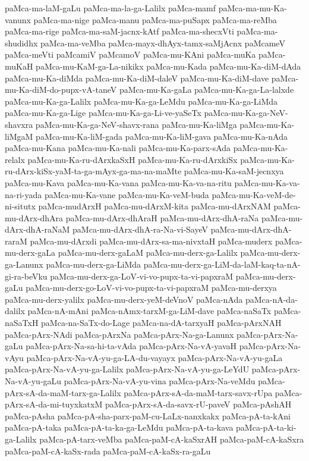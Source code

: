 {paMca-ma-laM-gaLu
paMca-ma-la-ga-Lalilx
paMca-mamf
paMca-ma-mu-Ka-vanunx
paMca-ma-nige
paMca-manu
paMca-ma-puSapx
paMca-ma-reMba
paMca-ma-rige
paMca-ma-saM-jacnx-kAtf
paMca-ma-shecxVti
paMca-ma-shudidhx
paMca-ma-veMba
paMca-mayx-dhAyx-tamx-saMjAcnx
paMcameV
paMca-meVti
paMcamiV
paMcamoV
paMca-mu-KAni
paMca-muKa
paMca-muKaH
paMca-mu-KaM-ga-La-nikikx
paMca-mu-Kada
paMca-mu-Ka-diM-dAda
paMca-mu-Ka-diMda
paMca-mu-Ka-diM-daleV
paMca-mu-Ka-diM-dave
paMca-mu-Ka-diM-do-pupx-vA-taneV
paMca-mu-Ka-gaLa
paMca-mu-Ka-ga-La-lalxde
paMca-mu-Ka-ga-Lalilx
paMca-mu-Ka-ga-LeMdu
paMca-mu-Ka-ga-LiMda
paMca-mu-Ka-ga-Lige
paMca-mu-Ka-ga-Li-ve-yaSeTx
paMca-mu-Ka-ga-NeV-shavxra
paMca-mu-Ka-ga-NeV-shavx-rana
paMca-mu-Ka-liMga
paMca-mu-Ka-liMgaM
paMca-mu-Ka-liM-gada
paMca-mu-Ka-liM-gava
paMca-mu-Ka-nAda
paMca-mu-Kana
paMca-mu-Ka-nali
paMca-mu-Ka-parx-sAda
paMca-mu-Ka-relalx
paMca-mu-Ka-ru-dArxkaSxH
paMca-mu-Ka-ru-dArxkiSx
paMca-mu-Ka-ru-dArx-kiSx-yaM-ta-ga-mAyx-ga-ma-na-maMte
paMca-mu-Ka-saM-jecnxya
paMca-mu-Kava
paMca-mu-Ka-vana
paMca-mu-Ka-va-na-ritu
paMca-mu-Ka-va-na-ri-yada
paMca-mu-Ka-vane
paMca-mu-Ka-veM-buda
paMca-mu-Ka-veM-de-ni-situtx
paMca-mudArxH
paMca-mu-dArxM-kita
paMca-mu-dArxNAM
paMca-mu-dArx-dhAra
paMca-mu-dArx-dhAraH
paMca-mu-dArx-dhA-raNa
paMca-mu-dArx-dhA-raNaM
paMca-mu-dArx-dhA-ra-Na-vi-SayeV
paMca-mu-dArx-dhA-raraM
paMca-mu-dArxdi
paMca-mu-dArx-sa-ma-nivxtaH
paMca-muderx
paMca-mu-derx-gaLa
paMca-mu-derx-gaLaM
paMca-mu-derx-ga-Lalilx
paMca-mu-derx-ga-Lanunx
paMca-mu-derx-ga-LiMda
paMca-mu-derx-ga-LiM-da-laM-kaq-ta-nA-gi-ra-beVku
paMca-mu-derx-ga-LoV-vi-vo-pupx-ta-vi-papxraM
paMca-mu-derx-gaLu
paMca-mu-derx-go-LoV-vi-vo-pupx-ta-vi-papxraM
paMca-mu-derxya
paMca-mu-derx-yalilx
paMca-mu-derx-yeM-deVnoV
paMca-nAda
paMca-nA-da-dalilx
paMca-nA-mAni
paMca-nAmx-tarxM-ga-LiM-dave
paMca-naSaTx
paMca-naSaTxH
paMca-na-SaTx-do-Lage
paMca-na-dA-tarxyaH
paMca-pArxNAH
paMca-pArx-NAdi
paMca-pArxNa
paMca-pArx-Na-ga-Lanunx
paMca-pArx-Na-gaLu
paMca-pArx-Na-sa-hi-ta-vAda
paMca-pArx-Na-vA-yavaH
paMca-pArx-Na-vAyu
paMca-pArx-Na-vA-yu-ga-LA-du-vayayx
paMca-pArx-Na-vA-yu-gaLa
paMca-pArx-Na-vA-yu-ga-Lalilx
paMca-pArx-Na-vA-yu-ga-LeYdU
paMca-pArx-Na-vA-yu-gaLu
paMca-pArx-Na-vA-yu-vina
paMca-pArx-Na-veMdu
paMca-pArx-sA-da-maM-tarx-ga-Lalilx
paMca-pArx-sA-da-maM-tarx-savx-rUpa
paMca-pArx-sA-da-mi-tuyxkatxM
paMca-pArx-sA-da-savx-rU-paveV
paMca-pAshAH
paMca-pAsha
paMca-pA-sha-parx-paM-cu-LaLx-nanxkakx
paMca-pA-ta-kAni
paMca-pA-taka
paMca-pA-ta-ka-ga-LeMdu
paMca-pA-ta-kava
paMca-pA-ta-ki-ga-Lalilx
paMca-pA-tarx-veMba
paMca-paM-cA-kaSxrAH
paMca-paM-cA-kaSxra
paMca-paM-cA-kaSx-rada
paMca-paM-cA-kaSx-ra-gaLu
}
